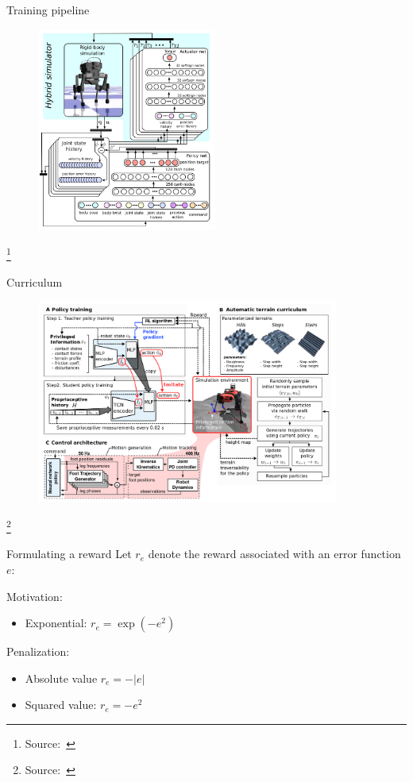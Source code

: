 \documentclass[10pt, aspectratio=1610]{beamer}
\newcommand\blfootnote[1]{%
  \begingroup
  \renewcommand\thefootnote{}%
  \footnote{#1}%
  \addtocounter{footnote}{-1}%
  \endgroup
}
\begin{document}
\begin{frame}{Training pipeline}
    \begin{figure}
        \includegraphics[height=6.7cm]{figures/quadruped-training.png}
    \end{figure}
    \vspace{-0.7cm}
    \blfootnote{
        Source:~\cite{hwangbo2019}
    }
\end{frame}

\begin{frame}{Curriculum}
    \begin{figure}
        \includegraphics[height=6.7cm]{figures/quadruped-curriculum.png}
    \end{figure}
    \vspace{-0.7cm}
    \blfootnote{
        Source:~\cite{lee2020}
    }
\end{frame}

\begin{frame}{Formulating a reward}
    Let $r_e$ denote the reward associated with an error function $e$:

    Motivation:
    \begin{itemize}
        \item Exponential: $r_e = \exp(-e^2)$
    \end{itemize}

    Penalization:
    \begin{itemize}
        \item Absolute value $r_e = -|e|$
        \item Squared value: $r_e = -e^2$
    \end{itemize}
\end{frame}
\end{document}
